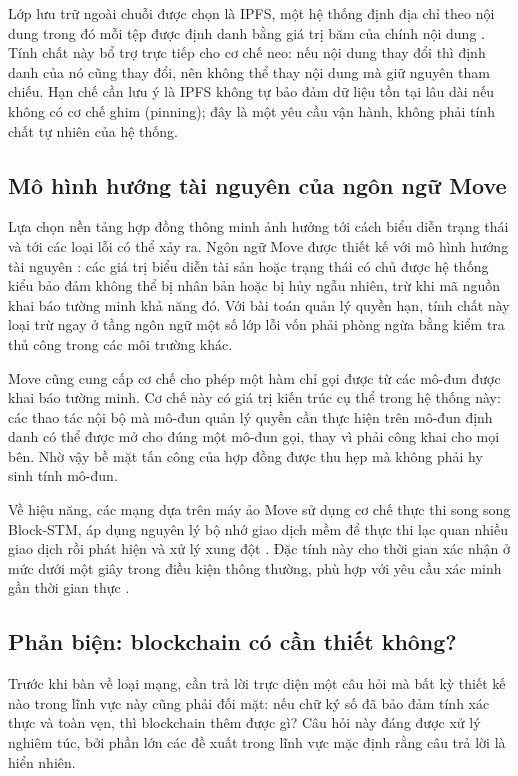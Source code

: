 Lớp lưu trữ ngoài chuỗi được chọn là IPFS, một hệ thống định địa chỉ theo nội dung trong đó mỗi tệp được định danh bằng giá trị băm của chính nội dung \cite{Benet2014}. Tính chất này bổ trợ trực tiếp cho cơ chế neo: nếu nội dung thay đổi thì định danh của nó cũng thay đổi, nên không thể thay nội dung mà giữ nguyên tham chiếu. Hạn chế cần lưu ý là IPFS không tự bảo đảm dữ liệu tồn tại lâu dài nếu không có cơ chế ghim (pinning); đây là một yêu cầu vận hành, không phải tính chất tự nhiên của hệ thống.

\subsection{Mô hình hướng tài nguyên của ngôn ngữ Move}

Lựa chọn nền tảng hợp đồng thông minh ảnh hưởng tới cách biểu diễn trạng thái và tới các loại lỗi có thể xảy ra. Ngôn ngữ Move được thiết kế với mô hình hướng tài nguyên \cite{Blackshear2019Move}: các giá trị biểu diễn tài sản hoặc trạng thái có chủ được hệ thống kiểu bảo đảm không thể bị nhân bản hoặc bị hủy ngẫu nhiên, trừ khi mã nguồn khai báo tường minh khả năng đó. Với bài toán quản lý quyền hạn, tính chất này loại trừ ngay ở tầng ngôn ngữ một số lớp lỗi vốn phải phòng ngừa bằng kiểm tra thủ công trong các môi trường khác.

Move cũng cung cấp cơ chế  cho phép một hàm chỉ gọi được từ các mô-đun được khai báo tường minh. Cơ chế này có giá trị kiến trúc cụ thể trong hệ thống này: các thao tác nội bộ mà mô-đun quản lý quyền cần thực hiện trên mô-đun định danh có thể được mở cho đúng một mô-đun gọi, thay vì phải công khai cho mọi bên. Nhờ vậy bề mặt tấn công của hợp đồng được thu hẹp mà không phải hy sinh tính mô-đun.

Về hiệu năng, các mạng dựa trên máy ảo Move sử dụng cơ chế thực thi song song Block-STM, áp dụng nguyên lý bộ nhớ giao dịch mềm để thực thi lạc quan nhiều giao dịch rồi phát hiện và xử lý xung đột \cite{Gelashvili2023}. Đặc tính này cho thời gian xác nhận ở mức dưới một giây trong điều kiện thông thường, phù hợp với yêu cầu xác minh gần thời gian thực \cite{Aptos2022}.

\subsection{Phản biện: blockchain có cần thiết không?}

Trước khi bàn về loại mạng, cần trả lời trực diện một câu hỏi mà bất kỳ thiết kế nào trong lĩnh vực này cũng phải đối mặt: nếu chữ ký số đã bảo đảm tính xác thực và toàn vẹn, thì blockchain thêm được gì? Câu hỏi này đáng được xử lý nghiêm túc, bởi phần lớn các đề xuất trong lĩnh vực mặc định rằng câu trả lời là hiển nhiên.

